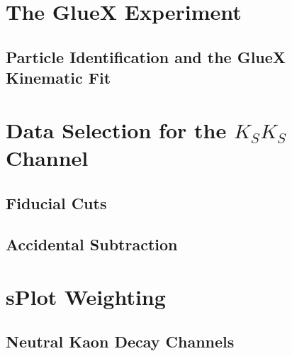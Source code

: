 \section{The GlueX Experiment}

\subsection{Particle Identification and the GlueX Kinematic Fit}\label{sub:particle-identification-and-the-gluex-kinematic-fit}

\section{Data Selection for the $K_SK_S$ Channel}\label{sec:data-selection}

\subsection{Fiducial Cuts}\label{sub:fiducial-cuts}

\subsection{Accidental Subtraction}\label{sub:accidental-subtraction}
\section{sPlot Weighting}\label{sec:splot}

\subsection{Neutral Kaon Decay Channels}\label{sub:neutral-kaon-decay-channels}

